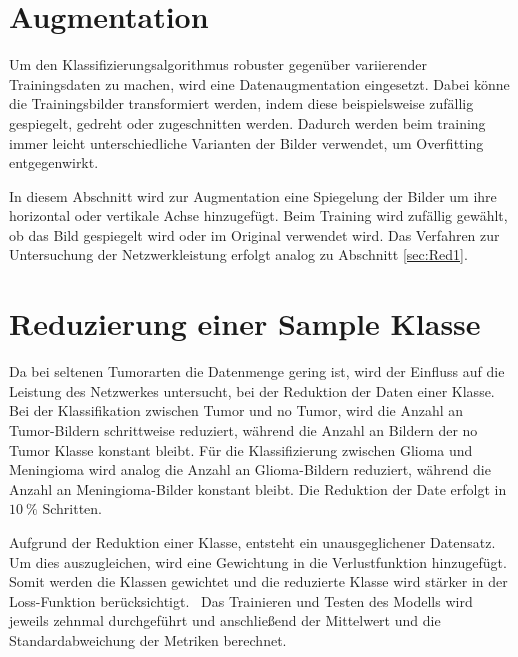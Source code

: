 \section{Augmentation}

Um den Klassifizierungsalgorithmus robuster gegenüber variierender Trainingsdaten zu machen, wird eine Datenaugmentation eingesetzt.
Dabei könne die Trainingsbilder transformiert werden, indem diese beispielsweise zufällig gespiegelt, gedreht oder zugeschnitten werden. 
Dadurch werden beim training immer leicht unterschiedliche Varianten der Bilder verwendet, um Overfitting entgegenwirkt.~\cite{Yamashita2018}

In diesem Abschnitt wird zur Augmentation eine Spiegelung der Bilder um ihre horizontal oder vertikale Achse hinzugefügt.
Beim Training wird zufällig gewählt, ob das Bild gespiegelt wird oder im Original verwendet wird.
Das Verfahren zur Untersuchung der Netzwerkleistung erfolgt analog zu Abschnitt \ref{sec:Red1}.    

\section{Reduzierung einer Sample Klasse}

Da bei seltenen Tumorarten die Datenmenge gering ist, wird der Einfluss auf die Leistung des Netzwerkes untersucht, 
bei der Reduktion der Daten einer Klasse.
Bei der Klassifikation zwischen Tumor und no Tumor, wird die Anzahl an Tumor-Bildern schrittweise reduziert, 
während die Anzahl an Bildern der no Tumor Klasse konstant bleibt.
Für die Klassifizierung zwischen Glioma und Meningioma wird analog die Anzahl an Glioma-Bildern reduziert, während die Anzahl an Meningioma-Bilder konstant bleibt.
Die Reduktion der Date erfolgt in $\qty{10}{\%}$ Schritten. 

Aufgrund der Reduktion einer Klasse, entsteht ein unausgeglichener Datensatz.
Um dies auszugleichen, wird eine Gewichtung in die Verlustfunktion hinzugefügt.
Somit werden die Klassen gewichtet und die reduzierte Klasse wird stärker in der Loss-Funktion berücksichtigt.~\cite{pytorchCrossEntropy}
Das Trainieren und Testen des Modells wird jeweils zehnmal durchgeführt und anschließend der Mittelwert und die Standardabweichung der
Metriken berechnet.


